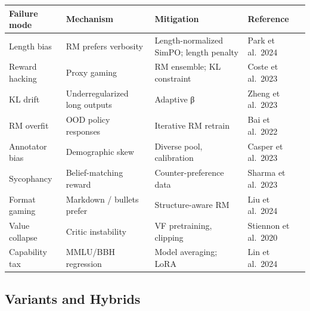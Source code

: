 {\def\LTcaptype{none} %
\begin{longtable}[]{@{}
  >{\raggedright\arraybackslash}p{}
  >{\raggedright\arraybackslash}p{}
  >{\raggedright\arraybackslash}p{}
  >{\raggedright\arraybackslash}p{}@{}}
\toprule\noalign{}
\begin{minipage}[b]{\linewidth}\raggedright
Failure mode
\end{minipage} & \begin{minipage}[b]{\linewidth}\raggedright
Mechanism
\end{minipage} & \begin{minipage}[b]{\linewidth}\raggedright
Mitigation
\end{minipage} & \begin{minipage}[b]{\linewidth}\raggedright
Reference
\end{minipage} \\
\midrule\noalign{}
\endhead
\bottomrule\noalign{}
\endlastfoot
Length bias & RM prefers verbosity & Length-normalized SimPO; length penalty & Park et al.~2024 \\
Reward hacking & Proxy gaming & RM ensemble; KL constraint & Coste et al.~2023 \\
KL drift & Underregularized long outputs & Adaptive β & Zheng et al.~2023 \\
RM overfit & OOD policy responses & Iterative RM retrain & Bai et al.~2022 \\
Annotator bias & Demographic skew & Diverse pool, calibration & Casper et al.~2023 \\
Sycophancy & Belief-matching reward & Counter-preference data & Sharma et al.~2023 \\
Format gaming & Markdown / bullets prefer & Structure-aware RM & Liu et al.~2024 \\
Value collapse & Critic instability & VF pretraining, clipping & Stiennon et al.~2020 \\
Capability tax & MMLU/BBH regression & Model averaging; LoRA & Lin et al.~2024 \\
\end{longtable}
}

\subsection{Variants and Hybrids}\label{variants-and-hybrids}

